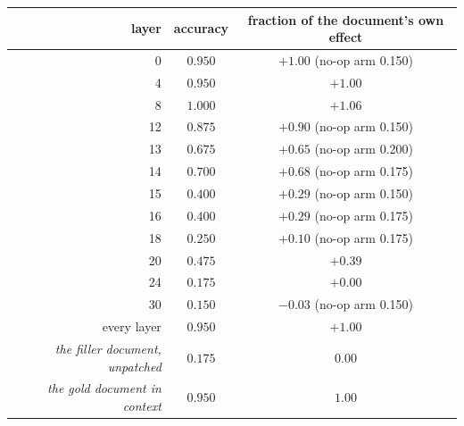 \begin{tabular}{@{}rcc@{}}
\toprule
\rowcolor{TableHeader}
layer & accuracy & fraction of the document's own effect \\
\midrule
0 & $0.950$ & $+1.00$ \quad\tiny(no-op arm 0.150) \\
4 & $0.950$ & $+1.00$ \\
8 & $1.000$ & $+1.06$ \\
12 & $0.875$ & $+0.90$ \quad\tiny(no-op arm 0.150) \\
13 & $0.675$ & $+0.65$ \quad\tiny(no-op arm 0.200) \\
14 & $0.700$ & $+0.68$ \quad\tiny(no-op arm 0.175) \\
15 & $0.400$ & $+0.29$ \quad\tiny(no-op arm 0.150) \\
16 & $0.400$ & $+0.29$ \quad\tiny(no-op arm 0.175) \\
18 & $0.250$ & $+0.10$ \quad\tiny(no-op arm 0.175) \\
20 & $0.475$ & $+0.39$ \\
24 & $0.175$ & $+0.00$ \\
30 & $0.150$ & $-0.03$ \quad\tiny(no-op arm 0.150) \\
\midrule
every layer & $0.950$ & $+1.00$ \\
\midrule
\emph{the filler document, unpatched} & $0.175$ & $0.00$ \\
\emph{the gold document in context} & $0.950$ & $1.00$ \\
\bottomrule
\end{tabular}
